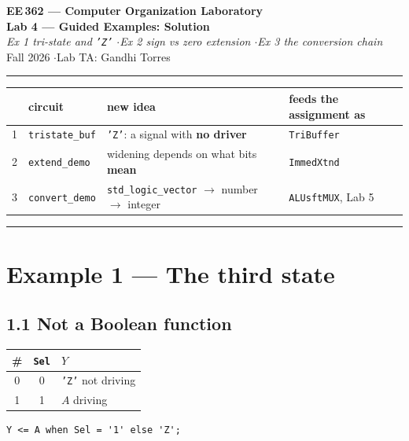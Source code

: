 \documentclass[11pt]{article}
\newcommand{\code}[1]{\texttt{#1}}
\newcommand{\hr}{\vspace{2pt}\hrule\vspace{6pt}}
\begin{document}
\begin{center}
{\Large\bfseries EE\,362 --- Computer Organization Laboratory}\\[2pt]
{\large\bfseries Lab 4 --- Guided Examples: Solution}\\[2pt]
{\itshape Ex 1 tri-state and \code{'Z'} \quad$\cdot$\quad Ex 2 sign vs zero extension \quad$\cdot$\quad Ex 3 the conversion chain}\\[4pt]
Fall 2026 \quad$\cdot$\quad Lab TA: Gandhi Torres
\end{center}
\hr

\begin{center}
\begin{tabular}{clll}
\toprule
& circuit & new idea & feeds the assignment as \\
\midrule
1 & \code{tristate\_buf} & \code{'Z'}: a signal with \textbf{no driver} & \code{TriBuffer} \\
2 & \code{extend\_demo} & widening depends on what bits \textbf{mean} & \code{ImmedXtnd} \\
3 & \code{convert\_demo} & \code{std\_logic\_vector} $\to$ number $\to$ integer & \code{ALUsftMUX}, Lab 5 \\
\bottomrule
\end{tabular}
\end{center}

\vspace{4pt}\hr

\section*{Example 1 --- The third state}

\subsection*{1.1 Not a Boolean function}

\begin{center}
\begin{tabular}{c|c|l}
\toprule
\# & \code{Sel} & $Y$ \\
\midrule
0 & 0 & \code{'Z'} \quad not driving \\
1 & 1 & $A$ \quad driving \\
\bottomrule
\end{tabular}
\end{center}

\begin{lstlisting}
Y <= A when Sel = '1' else 'Z';
\end{lstlisting}
\end{document}
